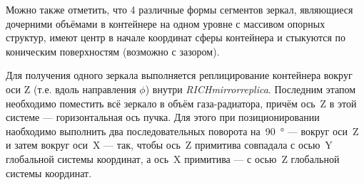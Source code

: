 Можно также отметить, что 4 различные формы сегментов зеркал, являющиеся дочерними объёмами в контейнере на одном уровне с массивом опорных структур, имеют центр в начале координат сферы контейнера и стыкуются по коническим поверхностям (возможно с зазором).

Для получения одного зеркала выполняется реплицирование контейнера вокруг оси Z (т.е. вдоль направления $\phi$) внутри 
\textit{RICH\textunderscore mirror\textunderscore replica}. 
Последним этапом необходимо поместить всё зеркало в объём газа-радиатора, причём ось~Z в этой системе --- горизонтальная ось пучка. Для этого при позиционировании наобходимо выполнить два последовательных поворота на~\SI{90}{\degree} --- вокруг оси~Z и затем вокруг оси~X --- так, чтобы ось~Z примитива совпадала с осью~Y глобальной системы координат, а ось~X примитива --- с осью~Z глобальной системы координат. %

